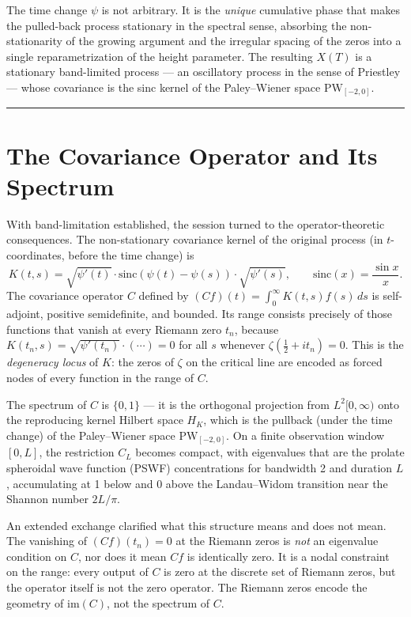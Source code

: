 \documentclass[12pt]{article}
\begin{document}
The time change $\psi$ is not arbitrary. It is the \textit{unique} cumulative phase that
makes the pulled-back process stationary in the spectral sense, absorbing the
non-stationarity of the growing argument and the irregular spacing of the zeros into a
single reparametrization of the height parameter. The resulting $X(T)$ is a stationary
band-limited process --- an oscillatory process in the sense of Priestley --- whose
covariance is the sinc kernel of the Paley--Wiener space $\mathrm{PW}_{[-2,0]}$.

\bigskip
\hrule
\bigskip

\section{The Covariance Operator and Its Spectrum}

With band-limitation established, the session turned to the operator-theoretic
consequences. The non-stationary covariance kernel of the original process (in
$t$-coordinates, before the time change) is
\[
    K(t,s)
    = \sqrt{\psi'(t)}\cdot\mathrm{sinc}(\psi(t)-\psi(s))\cdot\sqrt{\psi'(s)},
    \qquad
    \mathrm{sinc}(x) = \frac{\sin x}{x}.
\]
The covariance operator $C$ defined by
$(Cf)(t) = \int_0^\infty K(t,s)f(s)\,ds$
is self-adjoint, positive semidefinite, and bounded. Its range consists precisely of
those functions that vanish at every Riemann zero $t_n$, because
$K(t_n, s) = \sqrt{\psi'(t_n)}\cdot(\cdots) = 0$ for all $s$ whenever
$\zeta(\tfrac{1}{2}+it_n) = 0$. This is the \textit{degeneracy locus} of $K$: the zeros
of $\zeta$ on the critical line are encoded as forced nodes of every function in the
range of $C$.

The spectrum of $C$ is $\{0, 1\}$ --- it is the orthogonal projection from
$L^2[0,\infty)$ onto the reproducing kernel Hilbert space $H_K$, which is the pullback
(under the time change) of the Paley--Wiener space $\mathrm{PW}_{[-2,0]}$. On a finite
observation window $[0,L]$, the restriction $C_L$ becomes compact, with eigenvalues
that are the prolate spheroidal wave function (PSWF) concentrations for bandwidth 2
and duration $L$, accumulating at 1 below and 0 above the Landau--Widom transition near
the Shannon number $2L/\pi$.

An extended exchange clarified what this structure means and does not mean. The
vanishing of $(Cf)(t_n) = 0$ at the Riemann zeros is \textit{not} an eigenvalue
condition on $C$, nor does it mean $Cf$ is identically zero. It is a nodal constraint
on the range: every output of $C$ is zero at the discrete set of Riemann zeros, but the
operator itself is not the zero operator. The Riemann zeros encode the geometry of
$\mathrm{im}(C)$, not the spectrum of $C$.
\end{document}

